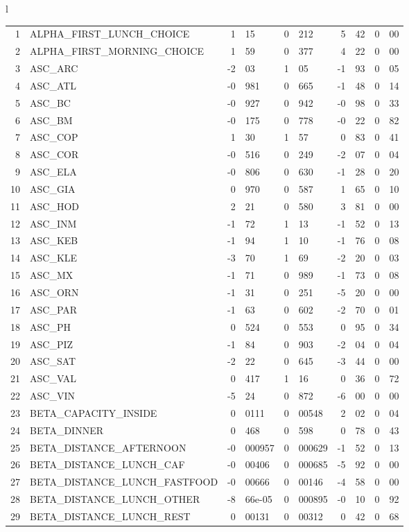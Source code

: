 \begin{tabular}{l}
\begin{tabular}{rlr@{.}lr@{.}lr@{.}lr@{.}l}
1 & ALPHA_FIRST_LUNCH_CHOICE & 1&15 & 0&212 & 5&42 & 0&00\\
2 & ALPHA_FIRST_MORNING_CHOICE & 1&59 & 0&377 & 4&22 & 0&00\\
3 & ASC_ARC & -2&03 & 1&05 & -1&93 & 0&05\\
4 & ASC_ATL  & -0&981 & 0&665 & -1&48 & 0&14\\
5 & ASC_BC & -0&927 & 0&942 & -0&98 & 0&33\\
6 & ASC_BM  & -0&175 & 0&778 & -0&22 & 0&82\\
7 & ASC_COP & 1&30 & 1&57 & 0&83 & 0&41\\
8 & ASC_COR  & -0&516 & 0&249 & -2&07 & 0&04\\
9 & ASC_ELA  & -0&806 & 0&630 & -1&28 & 0&20\\
10 & ASC_GIA  & 0&970 & 0&587 & 1&65 & 0&10\\
11 & ASC_HOD  & 2&21 & 0&580 & 3&81 & 0&00\\
12 & ASC_INM  & -1&72 & 1&13 & -1&52 & 0&13\\
13 & ASC_KEB  & -1&94 & 1&10 & -1&76 & 0&08\\
14 & ASC_KLE & -3&70 & 1&69 & -2&20 & 0&03\\
15 & ASC_MX  & -1&71 & 0&989 & -1&73 & 0&08\\
16 & ASC_ORN  & -1&31 & 0&251 & -5&20 & 0&00\\
17 & ASC_PAR  & -1&63 & 0&602 & -2&70 & 0&01\\
18 & ASC_PH  & 0&524 & 0&553 & 0&95 & 0&34\\
19 & ASC_PIZ  & -1&84 & 0&903 & -2&04 & 0&04\\
20 & ASC_SAT  & -2&22 & 0&645 & -3&44 & 0&00\\
21 & ASC_VAL  & 0&417 & 1&16 & 0&36 & 0&72\\
22 & ASC_VIN & -5&24 & 0&872 & -6&00 & 0&00\\
23 & BETA_CAPACITY_INSIDE & 0&0111 & 0&00548 & 2&02 & 0&04\\
24 & BETA_DINNER & 0&468 & 0&598 & 0&78 & 0&43\\
25 & BETA_DISTANCE_AFTERNOON & -0&000957 & 0&000629 & -1&52 & 0&13\\
26 & BETA_DISTANCE_LUNCH_CAF & -0&00406 & 0&000685 & -5&92 & 0&00\\
27 & BETA_DISTANCE_LUNCH_FASTFOOD & -0&00666 & 0&00146 & -4&58 & 0&00\\
28 & BETA_DISTANCE_LUNCH_OTHER & -8&66e-05 & 0&000895 & -0&10 & 0&92\\
29 & BETA_DISTANCE_LUNCH_REST & 0&00131 & 0&00312 & 0&42 & 0&68\\

\end{tabular}
\end{tabular}
